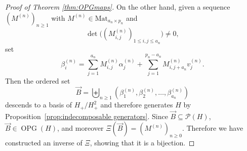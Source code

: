 \documentclass[11pt]{amsart}
\theoremstyle{definition}
\numberwithin{equation}{section}
\def\CC{{\mathbb C}}
\DeclareMathOperator{\GL}{GL}
\newcommand{\OPG}{\operatorname{OPG}}
\newcommand{\lucas}[1]{\todo[size=\tiny,color=red!50]{#1 \\ \hfill --- Lucas}}
\begin{document}
\begin{proof}[Proof of Theorem \ref{thm:OPGmaps}]
%    
%    
    On the other hand, given a sequence $\left(M^{(n)}\right)_{n \geq 1}$ with $M^{(n)} \in \textrm{Mat}_{a_n \times p_n}$ and
    \[\det\big( (M^{(n)}_{i, j})_{1 \le i, j \le a_{n}} \big) \neq 0,\] set
    \[
        \beta_i^{(n)} = \sum_{j = 1}^{a_n} M^{(n)}_{i, j}\alpha_{j}^{(n)} + \sum_{j = 1}^{p_n - a_{n}} M^{(n)}_{i, j+a_{n}}v_{j}^{(n)}.
    \]
    Then the ordered set
    \[
        \vec{B} = \biguplus_{n\geq 1} \left(\beta_1^{(n)},\beta_2^{(n)},\ldots,\beta_{a_n}^{(n)}\right)
    \]
    descends to a basis of $H_{+}/H_{+}^{2}$ and therefore generates $H$ by Proposition~\ref{prop:indecomposable generators}.  Since $\vec{B} \subseteq \mathcal{P}(H)$, $\vec{B} \in \OPG(H)$, and moreover $\Xi(\vec{B}) = (M^{(n)})_{n \ge 0}$.  Therefore we have constructed an inverse of $\Xi$, showing that it is a bijection.
\end{proof}

\end{document}
